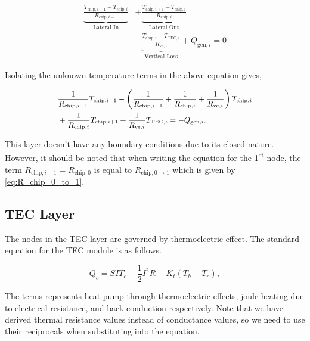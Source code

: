 \documentclass[10pt,a4paper,twocolumn]{article}
\begin{document}
\begin{align*}
  \underbrace{\frac{T_{\text{chip}, i-1} - T_{\text{chip}, i}}{R_{\text{chip}, i-1}}}_{\text{Lateral In}} & + \underbrace{\frac{T_{\text{chip}, i+1} - T_{\text{chip}, i}}{R_{\text{chip}, i}}}_{\text{Lateral Out}} \\ &- \underbrace{\frac{T_{\text{chip}, i} - T_{\text{TEC}, i}}{R_{\text{ve}, i}}}_{\text{Vertical Loss}} + Q_{\text{gen}, i} = 0
\end{align*}

Isolating the unknown temperature terms in the above equation gives,

\begin{equation}
  \small
  \begin{aligned}
     & \frac{1}{R_{\text{chip}, i-1}} T_{\text{chip}, i-1}-\left(
    \frac{1}{R_{\text{chip}, i-1}} + \frac{1}{R_{\text{chip}, i}} + \frac{1}{R_{\text{ve}, i}}
    \right) T_{\text{chip}, i}                                                                           \\
     & + \frac{1}{R_{\text{chip}, i}} T_{\text{chip}, i+1}+ \frac{1}{R_{\text{ve}, i}} T_{\text{TEC}, i}
    =- Q_{\text{gen}, i}.
  \end{aligned}
\end{equation}

This layer doesn't have any boundary conditions due to its closed nature. However, it should be noted that when writing the equation for the 1\textsuperscript{st} node, the term $R_{\text{chip},i-1} = R_{\text{chip},0}$ is equal to $R_{\text{chip}, 0\to 1}$ which is given by \cref{eq:R_chip_0_to_1}.

\subsection{TEC Layer}

The nodes in the TEC layer are governed by thermoelectric effect. The standard equation for the TEC module is as follows.

\begin{equation}
  Q_{c}=S I T_{c}-\textstyle{\frac{1}{2}}I^{2}R-K_t\left(T_{h}-T_{c}\right),
  \label{eq:TEC_standard}
\end{equation}

The terms represents heat pump through thermoelectric effects, joule heating due to electrical resistance, and back conduction respectively. Note that we have derived thermal resistance values instead of conductance values, so we need to use their reciprocals when substituting into the equation.
\end{document}
